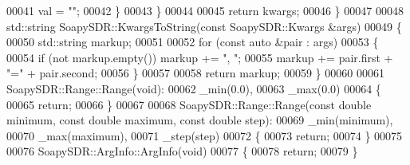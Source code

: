 \begin{DoxyCode}
00041             val = \textcolor{stringliteral}{""};
00042         \}
00043     \}
00044 
00045     \textcolor{keywordflow}{return} kwargs;
00046 \}
00047 
00048 std::string SoapySDR::KwargsToString(\textcolor{keyword}{const} SoapySDR::Kwargs &args)
00049 \{
00050     std::string markup;
00051 
00052     \textcolor{keywordflow}{for} (\textcolor{keyword}{const} \textcolor{keyword}{auto} &pair : args)
00053     \{
00054         \textcolor{keywordflow}{if} (not markup.empty()) markup += \textcolor{stringliteral}{", "};
00055         markup += pair.first + \textcolor{stringliteral}{"="} + pair.second;
00056     \}
00057 
00058     \textcolor{keywordflow}{return} markup;
00059 \}
00060 
00061 SoapySDR::Range::Range(\textcolor{keywordtype}{void}):
00062     \_min(0.0),
00063     \_max(0.0)
00064 \{
00065     \textcolor{keywordflow}{return};
00066 \}
00067 
00068 SoapySDR::Range::Range(\textcolor{keyword}{const} \textcolor{keywordtype}{double} minimum, \textcolor{keyword}{const} \textcolor{keywordtype}{double} maximum, \textcolor{keyword}{const} \textcolor{keywordtype}{double} 
      step):
00069     _min(minimum),
00070     _max(maximum),
00071     _step(step)
00072 \{
00073     \textcolor{keywordflow}{return};
00074 \}
00075 
00076 SoapySDR::ArgInfo::ArgInfo(\textcolor{keywordtype}{void})
00077 \{
00078     \textcolor{keywordflow}{return};
00079 \}
\end{DoxyCode}
